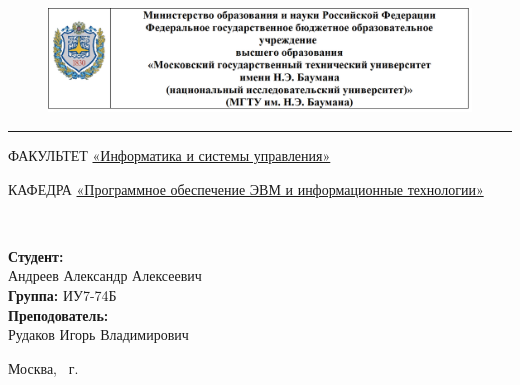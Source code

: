 \documentclass[a4paper, 12pt]{article}
\begin{document}
	
\begin{titlepage}
	\fontsize{12pt}{12pt}\selectfont
	\begin{figure}[t!]
		\centering
		\includegraphics[scale=0.8]{bmstu}
	\end{figure}
	
	\noindent\rule{15cm}{3pt}
	\newline\newline
	\noindent 
	ФАКУЛЬТЕТ 
	\underline{«Информатика и системы управления»} \newline
	
	\noindent КАФЕДРА \underline{«Программное обеспечение ЭВМ и информационные технологии»}\newline\newline\newline\newline\newline
	
	\vspace{4mm}
	
	\\ 
	\vspace{20mm}
	
	
	\begin{flushright}
		{\small	\textbf{Студент:}\\Андреев Александр Алексеевич \\ \textbf{Группа:} ИУ7-74Б
			\vspace{3mm}
			\\\textbf{Преподователь:} \\ Рудаков Игорь Владимирович }
	\end{flushright}
	
	\begin{center}
		\vfill
		Москва, \the\year
		~г.
	\end{center}
\end{titlepage}

\tableofcontents
\clearpage
\newpage
\end{document}
